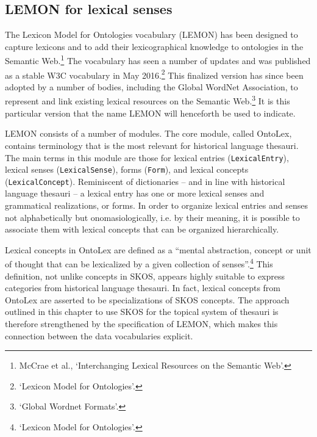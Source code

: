 \subsection{LEMON for lexical senses}
\label{sect:Stolk_thes-digital-form:lemon}
The Lexicon Model for Ontologies vocabulary (LEMON) has been designed to capture lexicons and to add their lexicographical knowledge to ontologies in the Semantic Web.\footnote{McCrae et al., `Interchanging Lexical Resources on the Semantic Web'.} %
The vocabulary has seen a number of updates and was published as a stable W3C vocabulary in May 2016.\footnote{`Lexicon Model for Ontologies'.} %
This finalized version has since been adopted by a number of bodies, including the Global WordNet Association, to represent and link existing lexical resources on the Semantic Web.\footnote{`Global Wordnet Formats'.} %
It is this particular version that the name LEMON will henceforth be used to indicate.

LEMON consists of a number of modules. The core module, called OntoLex, contains terminology that is the most relevant for historical language thesauri. The main terms in this module are those for lexical entries (\texttt{LexicalEntry}), lexical senses (\texttt{LexicalSense}), forms (\texttt{Form}), and lexical concepts (\texttt{LexicalConcept}). Reminiscent of dictionaries -- and in line with historical language thesauri -- a lexical entry has one or more lexical senses and grammatical realizations, or forms. In order to organize lexical entries and senses not alphabetically but onomasiologically, i.e. by their meaning, it is possible to associate them with lexical concepts that can be organized hierarchically. 

Lexical concepts in OntoLex are defined as a ``mental abstraction, concept or unit of thought that can be lexicalized by a given collection of senses''.\footnote{`Lexicon Model for Ontologies'.} This definition, not unlike concepts in SKOS, appears highly suitable to express categories from historical language thesauri. In fact, lexical concepts from OntoLex are asserted to be specializations of SKOS concepts. The approach outlined in this chapter to use SKOS for the topical system of thesauri is therefore strengthened by the specification of LEMON, which makes this connection between the data vocabularies explicit.

